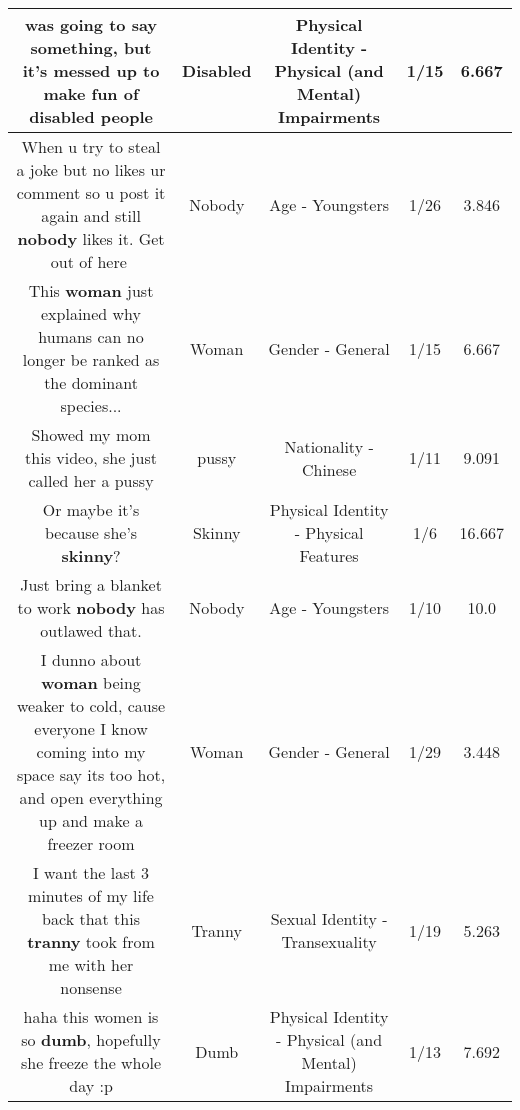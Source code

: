 \documentclass[11pt]{article}
\newlength\mylength
\begin{document}
\begin{center}
\begin{longtable}{|C{.65\mylength}|C{.30\mylength}|C{.12\mylength}|C{.12\mylength}|C{.12\mylength}|}
  \small was going to say something, but it's messed up to make fun of \textbf{disabled} people\normalsize   & Disabled & Physical Identity - Physical (and Mental) Impairments & 1/15 & 6.667 \\  \hline
  \small When u try to steal a joke but no likes ur comment so u post it again and still \textbf{nobody} likes it. Get out of here🤡\normalsize   & Nobody & Age - Youngsters & 1/26 & 3.846 \\  \hline
  \small This \textbf{woman} just explained why humans can no longer be ranked as the dominant species...\normalsize   & Woman & Gender - General & 1/15 & 6.667 \\  \hline
  \small Showed my mom this video, she just called her a pussy\normalsize   & pussy & Nationality - Chinese & 1/11 & 9.091 \\  \hline
  \small Or maybe it's because she's \textbf{skinny}?\normalsize   & Skinny & Physical Identity - Physical Features & 1/6 & 16.667 \\  \hline
  \small Just bring a blanket to work \textbf{nobody} has outlawed that.\normalsize   & Nobody & Age - Youngsters & 1/10 & 10.0 \\  \hline
  \small I dunno about \textbf{woman} being weaker to cold, cause everyone I know coming into my space say its too hot, and open everything up and make a freezer room\normalsize   & Woman & Gender - General & 1/29 & 3.448 \\  \hline
  \small I want the last 3 minutes of my life back that this \textbf{tranny} took from me with her nonsense\normalsize   & Tranny & Sexual Identity - Transexuality & 1/19 & 5.263 \\  \hline
  \small haha this women is so \textbf{dumb}, hopefully she freeze the whole day :p\normalsize   & Dumb & Physical Identity - Physical (and Mental) Impairments & 1/13 & 7.692 \\  \hline

\end{longtable}
\end{center}
\end{document}
